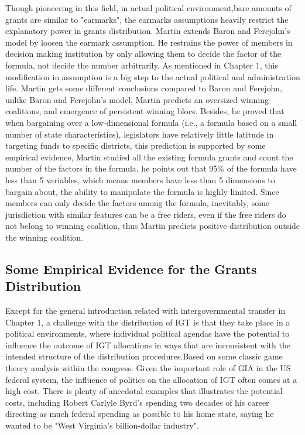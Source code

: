 Though pioneering in this field, in actual political environment,bare amounts of grants are similar to "earmarks", the earmarks assumptions heavily restrict the explanatory power in grants distribution. Martin \cite{martin2018dividing} extends Baron and Ferejohn's model by loosen the earmark assumption. He restrains the power of members in decision making institution by only allowing them to decide the factor of the formula, not decide the number arbitrarily. As mentioned in Chapter 1, this modification in assumption is a big step to the actual political and administration life. Martin gets some different conclusions compared to Baron and Ferejohn, unlike Baron and Ferejohn’s model, Martin predicts an oversized winning coalitions, and emergence of persistent winning blocs. Besides, he proved that when bargaining over a low-dimensional formula (i.e., a formula based on a small number of state characteristics), legislators have relatively little latitude in targeting funds to specific districts, this prediction is supported by some empirical evidence, Martin studied all the existing formula grants and count the number of the factors in the formula, he points out that 95\% of the formula have less than 5 variables, which means members have less than 5 dimensions to bargain about, the ability to manipulate the formula is highly limited. Since members can only decide the factors among the formula, inevitably, some jurisdiction with similar features can be a free riders, even if the free riders do not belong to winning coalition, thus Martin predicts positive distribution outside the winning coalition. 

\subsection{Some Empirical Evidence for the Grants Distribution}
Except for the general introduction related with intergovernmental transfer in Chapter 1, a challenge with the distribution of IGT is that they take place in a political environments, where individual political agendas have the potential to influence the outcome of IGT allocations in ways that are inconsistent with the intended structure of the distribution procedures.Based on some classic game theory analysis within the congress. Given the important role of GIA in the US federal system, the influence of politics on the allocation of IGT often comes at a high cost. There is plenty of anecdotal examples that illustrates the potential costs, including Robert Carlyle Byrd's spending two decades of his career directing as much federal spending as possible to his home state, saying he wanted to be "West Virginia's billion-dollar industry". 

